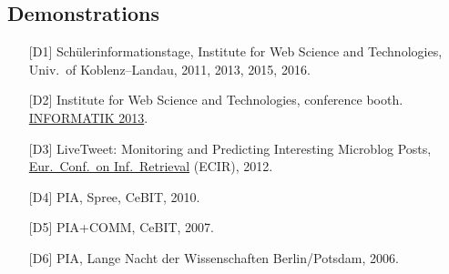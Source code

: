 \documentclass[line,mm]{res}
\newcounter{x}
\begin{document}
\begin{resume}
\section{Demonstrations}
\begin{itemize}
 \item[{[D1]}] 
   Schülerinformationstage, Institute for Web Science and
   Technologies, Univ.\ of Koblenz--Landau, 2011, 2013, 2015, 2016.  
 \item[{[D2]}] Institute for Web Science and Technologies, conference booth.
       \href{http://informatik2013.de}{INFORMATIK 2013}.  
 \item[{[D3]}] 
   LiveTweet: Monitoring and Predicting Interesting Microblog
       Posts, \href{http://ecir2012.upf.edu/}{Eur.\ Conf.\ on Inf.\ Retrieval} (ECIR),
       2012. 
 \item[{[D4]}] PIA, Spree, CeBIT, 2010.
 \item[{[D5]}] 
   PIA+COMM, CeBIT, 2007.
 \item[{[D6]}] PIA, Lange Nacht der Wissenschaften Berlin/Potsdam, 2006. 
\end{itemize}


\end{resume}
\end{document}

